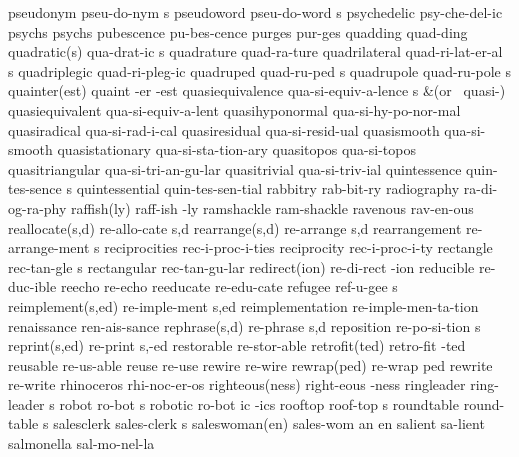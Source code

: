\5 pseudonym		pseu-do-nym s
\5 pseudoword		pseu-do-word s
\1 psychedelic		psy-che-del-ic
\1 psychs		psychs
\1 pubescence		pu-bes-cence
\1 purges		pur-ges			%
\1 quadding		quad-ding
\2 quadratic(s)		qua-drat-ic s
\1 quadrature		quad-ra-ture
\5 quadrilateral	quad-ri-lat-er-al s	%
\1 quadriplegic		quad-ri-pleg-ic
\5 quadruped		quad-ru-ped s		%
\5 quadrupole		quad-ru-pole s		%
\3 quainter(est)	quaint -er -est
\5 quasiequivalence	qua-si-equiv-a-lence s
\tabalign {}		&\null\quad (or \ quasi-{}) \cr
\1 quasiequivalent	qua-si-equiv-a-lent	%
\1 quasihyponormal	qua-si-hy-po-nor-mal
\1 quasiradical 	qua-si-rad-i-cal
\1 quasiresidual	qua-si-resid-ual
\1 quasismooth		qua-si-smooth
\1 quasistationary	qua-si-sta-tion-ary
\1 quasitopos		qua-si-topos
\1 quasitriangular	qua-si-tri-an-gu-lar
\1 quasitrivial		qua-si-triv-ial		%
\5 quintessence		quin-tes-sence s
\1 quintessential	quin-tes-sen-tial
\1 rabbitry		rab-bit-ry
\1 radiography		ra-di-og-ra-phy
\2 raffish(ly)		raff-ish -ly
\1 ramshackle		ram-shackle
\1 ravenous		rav-en-ous
\2 reallocate(s,d)	re-allo-cate s,d	%
\2 rearrange(s,d)	re-arrange s,d		%
\5 rearrangement	re-arrange-ment s
\1 reciprocities	rec-i-proc-i-ties
\1 reciprocity		rec-i-proc-i-ty
\5 rectangle		rec-tan-gle s
\1 rectangular		rec-tan-gu-lar
\2 redirect(ion)	re-di-rect -ion		%
\1 reducible            re-duc-ible	%
\1 reecho		re-echo
\1 reeducate		re-edu-cate		%
\5 refugee		ref-u-gee s		%
\2 reimplement(s,ed)	re-imple-ment s,ed	%
\1 reimplementation	re-imple-men-ta-tion	%
\1 renaissance		ren-ais-sance		%
\2 rephrase(s,d)	re-phrase s,d		%
\5 reposition		re-po-si-tion s		%
\2 reprint(s,ed)	re-print s,-ed
\1 restorable		re-stor-able
\2 retrofit(ted)	retro-fit -ted
\1 reusable		re-us-able		%
\1 reuse		re-use			%
\1 rewire		re-wire 		%
\2 rewrap(ped)		re-wrap ped		%
\1 rewrite		re-write		%
\1 rhinoceros		rhi-noc-er-os
\2 righteous(ness)	right-eous -ness
\5 ringleader		ring-leader s
\5 robot		ro-bot s
\6 robotic		ro-bot ic -ics
\5 rooftop		roof-top s		%
\5 roundtable		round-table s
\5 salesclerk		sales-clerk s
\3 saleswoman(en)	sales-wom an en
\NewWordtrue
\1 salient		sa-lient		%
\1 salmonella		sal-mo-nel-la
